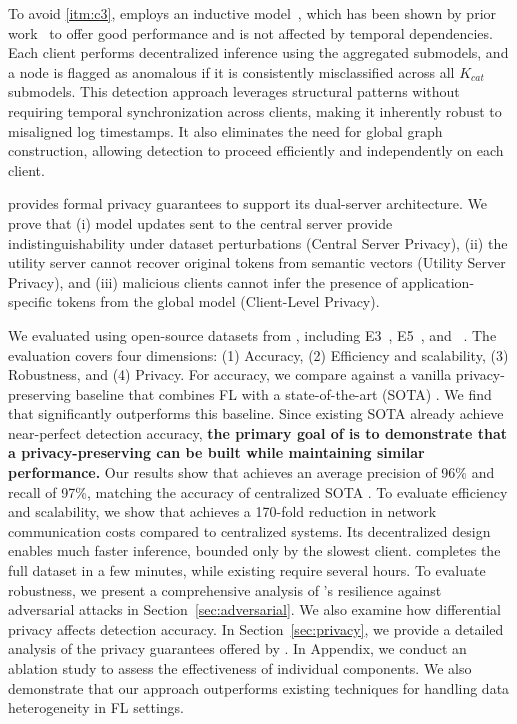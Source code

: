 To avoid \ref{itm:c3}, \Sys employs an inductive \gnnshort model~\cite{hamilton2017inductive}, which has been shown by prior work~\cite{flash2024,shadewatcher,wang2022threatrace} to offer good performance and is not affected by temporal dependencies. Each client performs decentralized inference using the aggregated submodels, and a node is flagged as anomalous if it is consistently misclassified across all \( K_{cat} \) submodels. This detection approach leverages structural patterns without requiring temporal synchronization across clients, making it inherently robust to misaligned log timestamps. It also eliminates the need for global graph construction, allowing detection to proceed efficiently and independently on each client.


 \Sys provides formal privacy guarantees to support its dual-server architecture.
We prove that (i) model updates sent to the central server provide indistinguishability under dataset perturbations (Central Server Privacy), (ii) the utility server cannot recover original tokens from semantic vectors (Utility Server Privacy), and (iii) malicious clients cannot infer the presence of application-specific tokens from the global model (Client-Level Privacy).


\smallskip
{}
\smallskip

\noindent
We evaluated \Sys using open-source datasets from \darpa, including E3~\cite{error3}, E5~\cite{bug5}, and \optc~\cite{anjum2021analyzing}. The evaluation covers four dimensions: (1) Accuracy, (2) Efficiency and scalability, (3) Robustness, and (4) Privacy. For accuracy, we compare \Sys against a vanilla privacy-preserving \pids baseline that combines FL with a state-of-the-art (SOTA) \pids. We find that \Sys significantly outperforms this baseline. Since existing SOTA \pids already achieve near-perfect detection accuracy, {\bf the primary goal of \Sys is to demonstrate that a privacy-preserving \pids can be built while maintaining similar performance.} Our results show that \Sys achieves an average precision of 96\% and recall of 97\%, matching the accuracy of centralized SOTA \pids. To evaluate efficiency and scalability, we show that \Sys achieves a 170-fold reduction in network communication costs compared to centralized systems. Its decentralized design enables much faster inference, bounded only by the slowest client. \Sys completes the full \optc dataset in a few minutes, while existing \pids require several hours. To evaluate robustness, we present a comprehensive analysis of \Sys’s resilience against adversarial attacks in Section~\ref{sec:adversarial}. We also examine how differential privacy affects detection accuracy. In Section~\ref{sec:privacy}, we provide a detailed analysis of the privacy guarantees offered by \Sys. In Appendix, we conduct an ablation study to assess the effectiveness of individual components. We also demonstrate that our approach outperforms existing techniques for handling data heterogeneity in FL settings. 

